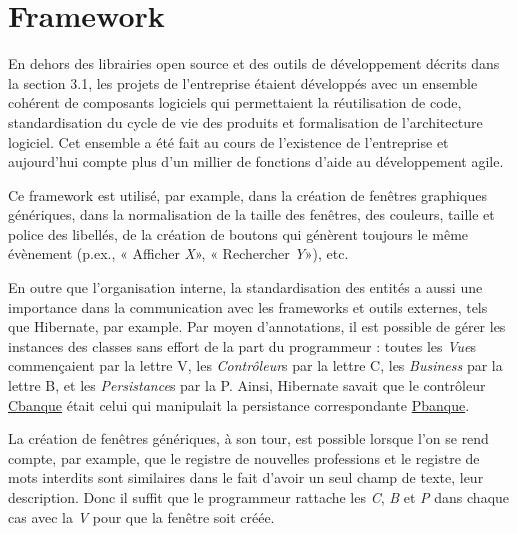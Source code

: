 \pagebreak
\section{Framework}

En dehors des librairies open source et des outils de développement décrits dans la section 3.1, les projets de l'entreprise étaient développés avec un ensemble cohérent de composants logiciels qui permettaient la réutilisation de code, standardisation du cycle de vie des produits et formalisation de l'architecture logiciel. Cet ensemble a été fait au cours de l'existence de l'entreprise et aujourd'hui compte plus d'un millier de fonctions d'aide au développement agile.


Ce framework est utilisé, par example, dans la création de fenêtres graphiques génériques, dans la normalisation de la taille des fenêtres, des couleurs, taille et police des libellés, de la création de boutons qui génèrent toujours le même évènement (p.ex., « Afficher \emph{X}», « Rechercher \emph{Y}»), etc. 

En outre que l'organisation interne, la standardisation des entités a aussi une importance dans la communication avec les frameworks et outils externes, tels que Hibernate, par example. Par moyen d'annotations, il est possible de gérer les instances des classes sans effort de la part du programmeur : toutes les \textit{Vue}s commençaient par la lettre V, les \textit{Contrôleur}s par la lettre C, les \textit{Business} par la lettre B, et les \textit{Persistance}s par la P. Ainsi, Hibernate savait que le contrôleur \underline{Cbanque} était celui qui manipulait la persistance correspondante \underline{Pbanque}.

La création de fenêtres génériques, à son tour, est possible lorsque l'on se rend compte, par example, que le registre de nouvelles professions et le registre de mots interdits sont similaires dans le fait d'avoir un seul champ de texte, leur description. Donc il suffit que le programmeur rattache les \textit{C}, \textit{B} et \textit{P} dans chaque cas avec la \textit{V} pour que la fenêtre soit créée.